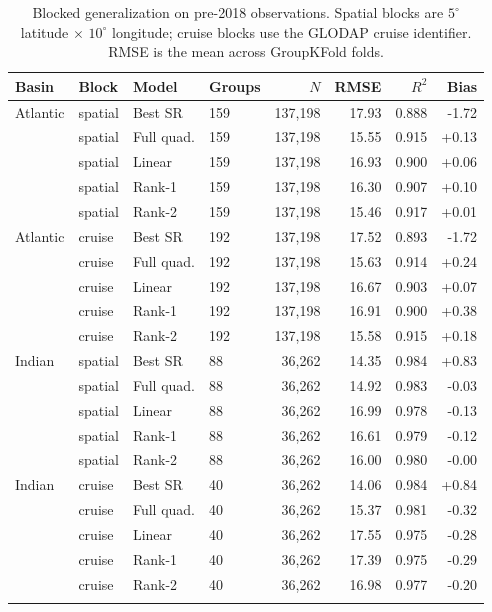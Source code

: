 \begin{table}[htbp]
\centering
\caption{Blocked generalization on pre-2018 observations. Spatial blocks are $5^\circ$ latitude $\times$ $10^\circ$ longitude; cruise blocks use the GLODAP cruise identifier. RMSE is the mean across GroupKFold folds.}
\label{tab:spatial}
\small
\begin{tabular}{llllrrrr}
\toprule
Basin & Block & Model & Groups & $N$ & RMSE & $R^2$ & Bias \\
\midrule
Atlantic & spatial & Best SR & 159 & 137,198 & 17.93 & 0.888 & -1.72 \\
 & spatial & Full quad. & 159 & 137,198 & 15.55 & 0.915 & +0.13 \\
 & spatial & Linear & 159 & 137,198 & 16.93 & 0.900 & +0.06 \\
 & spatial & Rank-1 & 159 & 137,198 & 16.30 & 0.907 & +0.10 \\
 & spatial & Rank-2 & 159 & 137,198 & 15.46 & 0.917 & +0.01 \\
Atlantic & cruise & Best SR & 192 & 137,198 & 17.52 & 0.893 & -1.72 \\
 & cruise & Full quad. & 192 & 137,198 & 15.63 & 0.914 & +0.24 \\
 & cruise & Linear & 192 & 137,198 & 16.67 & 0.903 & +0.07 \\
 & cruise & Rank-1 & 192 & 137,198 & 16.91 & 0.900 & +0.38 \\
 & cruise & Rank-2 & 192 & 137,198 & 15.58 & 0.915 & +0.18 \\
\addlinespace
Indian & spatial & Best SR & 88 & 36,262 & 14.35 & 0.984 & +0.83 \\
 & spatial & Full quad. & 88 & 36,262 & 14.92 & 0.983 & -0.03 \\
 & spatial & Linear & 88 & 36,262 & 16.99 & 0.978 & -0.13 \\
 & spatial & Rank-1 & 88 & 36,262 & 16.61 & 0.979 & -0.12 \\
 & spatial & Rank-2 & 88 & 36,262 & 16.00 & 0.980 & -0.00 \\
Indian & cruise & Best SR & 40 & 36,262 & 14.06 & 0.984 & +0.84 \\
 & cruise & Full quad. & 40 & 36,262 & 15.37 & 0.981 & -0.32 \\
 & cruise & Linear & 40 & 36,262 & 17.55 & 0.975 & -0.28 \\
 & cruise & Rank-1 & 40 & 36,262 & 17.39 & 0.975 & -0.29 \\
 & cruise & Rank-2 & 40 & 36,262 & 16.98 & 0.977 & -0.20 \\
\addlinespace

\end{tabular}
\end{table}
